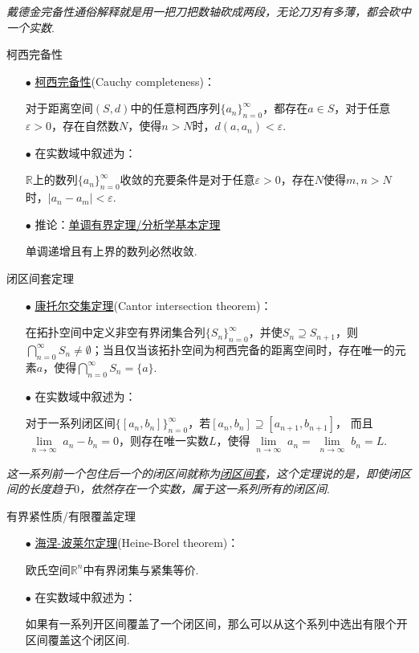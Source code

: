 \documentclass[main.tex]{subfiles}
\begin{document}
\textit{戴德金完备性通俗解释就是用一把刀把数轴砍成两段，无论刀刃有多薄，都会砍中一个实数}.

\begin{theorem}{柯西完备性}
    \begin{itemize}
        \item [\(\bullet\)]\uline{柯西完备性}(Cauchy completeness)：
        \par 对于距离空间\((S,d)\)中的任意柯西序列\(\{a_n\}_{n=0}^{\infty}\)，都存在\(a \in S\)，对于任意\(\varepsilon>0\)，存在自然数\(N\)，使得\(n>N\)时，\(d(a,a_n) < \varepsilon\).
        \item [\(\bullet\)] 在实数域中叙述为：
        \par \(\mathbb{R}\)上的数列\(\{a_n\}_{n=0}^{\infty}\)收敛的充要条件是对于任意\(\varepsilon>0\)，存在\(N\)使得\(m,n>N\)时，\(|a_n-a_m| < \varepsilon\).
        \item [\(\bullet\)] 推论：\uline{单调有界定理/分析学基本定理}
        \par 单调递增且有上界的数列必然收敛.
    \end{itemize}
\end{theorem}

\begin{theorem}{闭区间套定理}
    \begin{itemize}
        \item [\(\bullet\)] \uline{康托尔交集定理}(Cantor intersection theorem)：
        \par 在拓扑空间中定义非空有界闭集合列\(\{S_n\}_{n=0}^{\infty}\)，并使\(S_n \supseteq S_{n+1}\)，则\(\bigcap_{n=0}^{\infty}S_n \neq \emptyset\)；当且仅当该拓扑空间为柯西完备的距离空间时，存在唯一的元素\(a\)，使得\(\bigcap_{n=0}^{\infty}S_n =\{a\}\).
        \item [\(\bullet\)] 在实数域中叙述为：
        \par 对于一系列闭区间\(\{[a_n,b_n]\}_{n=0}^{\infty}\)，若\([a_n,b_n]\supseteq [a_{n+1},b_{n+1}]\)， 而且\(\lim \limits_{\substack{n \to \infty}}a_n-b_n=0\)，则存在唯一实数\(L\)，使得\(\lim \limits_{\substack{n\to\infty}}a_n=\lim \limits_{\substack{n\to\infty}}b_n=L\).
    \end{itemize}   
\end{theorem}

\textit{这一系列前一个包住后一个的闭区间就称为\uline{闭区间套}，这个定理说的是，即使闭区间的长度趋于\(0\)，依然存在一个实数，属于这一系列所有的闭区间}.

\begin{theorem}{有界紧性质/有限覆盖定理}
    \begin{itemize}
        \item [\(\bullet\)] \uline{海涅-波莱尔定理}(Heine-Borel theorem)：
        \par 欧氏空间\(\mathbb{R}^n\)中有界闭集与紧集等价.
        \item [\(\bullet\)] 在实数域中叙述为：
        \par 如果有一系列开区间覆盖了一个闭区间，那么可以从这个系列中选出有限个开区间覆盖这个闭区间.
    \end{itemize}
\end{theorem}
\end{document}
